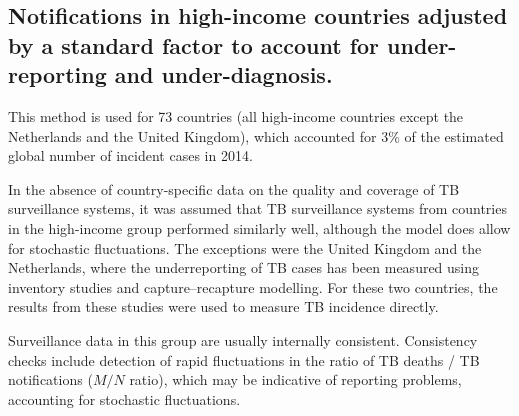 \subsection {Notifications in high-income countries adjusted by a standard factor to account for under-reporting and under-diagnosis.} This method is used for 73 countries (all high-income countries except the Netherlands and the United Kingdom), which accounted for 3\% of the estimated global number of incident cases in 2014.

In the absence of country-specific data on the quality and coverage of TB surveillance systems, it was assumed that TB surveillance systems from countries in the high-income group performed similarly well, although the model does allow for stochastic fluctuations. The exceptions were the United Kingdom and the Netherlands, where the underreporting of TB cases has been measured using inventory studies and capture–recapture modelling\cite{Anderson2010}\cite{17156496}. For these two countries, the results from these studies were used to measure TB incidence directly.

Surveillance data in this group are usually internally consistent. Consistency checks include detection of rapid fluctuations in the ratio of TB deaths / TB notifications ($M/N$ ratio), which may be indicative of reporting problems, accounting for stochastic fluctuations.



